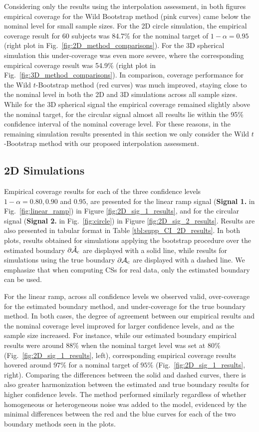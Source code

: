 Considering only the results using the interpolation assessment, in both figures empirical coverage for the Wild Bootstrap method (pink curves) came below the nominal level for small sample sizes. For the 2D circle simulation, the empirical coverage result for 60 subjects was 84.7\% for the nominal target of $1 - \alpha = 0.95$ (right plot in Fig.\ \ref{fig:2D_method_comparisons}). For the 3D spherical simulation this under-coverage was even more severe, where the corresponding empirical coverage result was 54.9\% (right plot in Fig.\ \ref{fig:3D_method_comparisons}). In comparison, coverage performance for the Wild $t$-Bootstrap method (red curves) was much improved, staying close to the nominal level in both the 2D and 3D simulations across all sample sizes. While for the 3D spherical signal the empirical coverage remained slightly above the nominal target, for the circular signal almost all results lie within the 95\% confidence interval of the nominal coverage level. For these reasons, in the remaining simulation results presented in this section we only consider the Wild $t$-Bootstrap method with our proposed interpolation assessment.  


\subsection{2D Simulations}
\label{sec:2D_simulation_results}
Empirical coverage results for each of the three confidence levels $1 - \alpha = 0.80, 0.90$ and $0.95$, are presented for the linear ramp signal (\textbf{Signal 1.} in Fig.\ \ref{fig:linear_ramp}) in Figure \ref{fig:2D_sig_1_results}, and for the circular signal (\textbf{Signal 2.} in Fig.\ \ref{fig:circle}) in Figure \ref{fig:2D_sig_2_results}. Results are also presented in tabular format in Table \ref{tbl:supp_CI_2D_results}.
In both plots, results obtained for simulations applying the bootstrap procedure over the estimated boundary $\operatorname{\partial\hat{\mathcal{A}}_{c}}$ are displayed with a solid line, while results for simulations using the true boundary $\operatorname{\partial\mathcal{A}_{c}}$ are displayed with a dashed line. We emphasize that when computing CSs for real data, only the estimated boundary can be used. 

For the linear ramp, across all confidence levels we observed valid, over-coverage for the estimated boundary method, and under-coverage for the true boundary method. In both cases, the degree of agreement between our empirical results and the nominal coverage level improved for larger confidence levels, and as the sample size increased. For instance, while our estimated boundary empirical results were around $88\%$ when the nominal target level was set at $80\%$  (Fig.\ \ref{fig:2D_sig_1_results}, left), corresponding empirical coverage results hovered around $97\%$ for a nominal target of $95\%$ (Fig.\ \ref{fig:2D_sig_1_results}, right). Comparing the differences between the solid and dashed curves, there is also greater harmonization between the estimated and true boundary results for higher confidence levels. The method performed similarly regardless of whether homogeneous or heterogeneous noise was added to the model, evidenced by the minimal differences between the red and the blue curves for each of the two boundary methods seen in the plots. 

